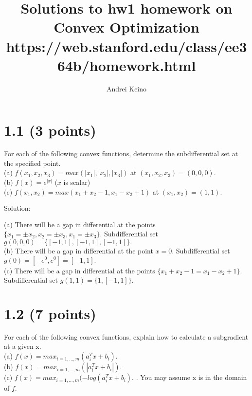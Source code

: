 \documentclass{article}
\begin{document}
\title{Solutions to hw1 homework on Convex Optimization https://web.stanford.edu/class/ee364b/homework.html}
\author{Andrei Keino}
\maketitle

\section*{1.1 (3 points)} 

For each of the following convex functions, determine the subdifferential set at the specified point.\\

(a) $f(x_1, x_2, x_3) = max(|x_1|, |x_2|, |x_3|)$ at 
$(x_1, x_2, x_3) = (0, 0, 0).$ \\

(b) $f(x) = e^{|x|}$ ($x$ is scalar)\\

(c) $f(x_1, x_2) = max(x_1 + x_2 - 1, x_1 - x_2 + 1)$
at $(x_1, x_2) = (1, 1).$

Solution:

(a) There will be a gap in differential at the points 
$\{x_1 = \pm x_2, x_2 = \pm x_3, x_1 = \pm x_3\}.$
Subdifferential set $g(0, 0, 0) = \{[-1, 1], [-1, 1], [-1, 1]\}.$ \\

(b) There will be a gap in differential at the point $x = 0.$ Subdifferential set $g(0) = [-e^0, e^0] = [-1, 1].$ \\

(c) There will be a gap in differential at the points 
$\{x_1 + x_2 - 1 = x_1 - x_2 + 1\}.$
Subdifferential set $g(1, 1) = \{1, [-1, 1]\}.$

\section*{1.2 (7 points)}
 For each of the following convex functions, explain how to calculate a subgradient at a given x.\\
 
 (a) $f(x) = max_{i = 1, \dots, m}(a_i^T x + b_i).$\\
 
 (b) $f(x) = max_{i = 1, \dots, m}(|a_i^T x + b_i|).$\\
 
 (c) $f(x) = max_{i = 1, \dots, m}(- 
 log(a_i^T x + b_i).$ . You may assume x is in the domain of $f.$\\
 
\end{document}
